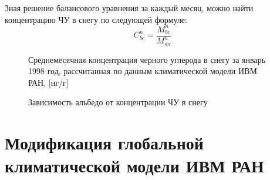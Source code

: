 \documentclass[a4paper, fontsize=14pt]{scrartcl}
\begin{document}
Зная решение балансового уравнения за каждый месяц, можно найти концентрацию ЧУ в снегу по
следующей формуле:
\begin{equation}
   C_{bc}^n = \dfrac{M_{bc}^n}{M_{sn}^n}  \label{sys}
\end{equation}


\begin{figure}[h]
    \caption{Среднемесячная концентрация черного углерода в снегу за январь 1998 год, рассчитанная по данным климатической модели ИВМ РАН, [нг/г]}
    \label{fig:image}
\end{figure}

\begin{figure}[h]
    \caption{Зависимость альбедо от концентрации ЧУ в снегу}
    \label{fig:image}
\end{figure}



\newpage
\section{Модификация глобальной климатической модели ИВМ РАН}
\end{document}
